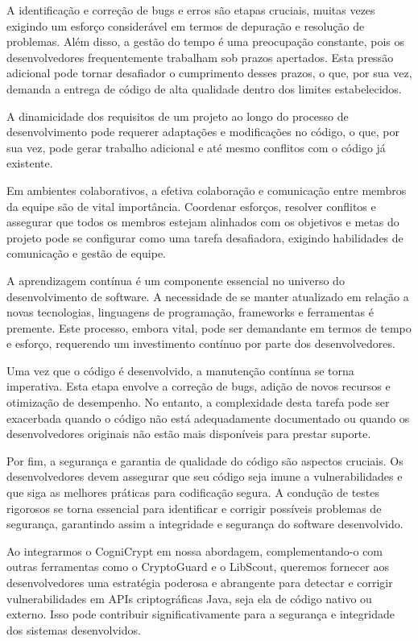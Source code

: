 A identificação e correção de bugs e erros são etapas cruciais, muitas vezes exigindo um esforço considerável em termos de depuração e resolução de problemas. Além disso, a gestão do tempo é uma preocupação constante, pois os desenvolvedores frequentemente trabalham sob prazos apertados. Esta pressão adicional pode tornar desafiador o cumprimento desses prazos, o que, por sua vez, demanda a entrega de código de alta qualidade dentro dos limites estabelecidos.

A dinamicidade dos requisitos de um projeto ao longo do processo de desenvolvimento pode requerer adaptações e modificações no código, o que, por sua vez, pode gerar trabalho adicional e até mesmo conflitos com o código já existente.

Em ambientes colaborativos, a efetiva colaboração e comunicação entre membros da equipe são de vital importância. Coordenar esforços, resolver conflitos e assegurar que todos os membros estejam alinhados com os objetivos e metas do projeto pode se configurar como uma tarefa desafiadora, exigindo habilidades de comunicação e gestão de equipe.

A aprendizagem contínua é um componente essencial no universo do desenvolvimento de software. A necessidade de se manter atualizado em relação a novas tecnologias, linguagens de programação, frameworks e ferramentas é premente. Este processo, embora vital, pode ser demandante em termos de tempo e esforço, requerendo um investimento contínuo por parte dos desenvolvedores.

Uma vez que o código é desenvolvido, a manutenção contínua se torna imperativa. Esta etapa envolve a correção de bugs, adição de novos recursos e otimização de desempenho. No entanto, a complexidade desta tarefa pode ser exacerbada quando o código não está adequadamente documentado ou quando os desenvolvedores originais não estão mais disponíveis para prestar suporte.

Por fim, a segurança e garantia de qualidade do código são aspectos cruciais. Os desenvolvedores devem assegurar que seu código seja imune a vulnerabilidades e que siga as melhores práticas para codificação segura. A condução de testes rigorosos se torna essencial para identificar e corrigir possíveis problemas de segurança, garantindo assim a integridade e segurança do software desenvolvido.

Ao integrarmos o CogniCrypt em nossa abordagem, complementando-o com outras ferramentas como o CryptoGuard e o LibScout, queremos fornecer aos desenvolvedores uma estratégia poderosa e abrangente para detectar e corrigir vulnerabilidades em APIs criptográficas Java, seja ela de código nativo ou externo. Isso pode contribuir significativamente para a segurança e integridade dos sistemas desenvolvidos.




